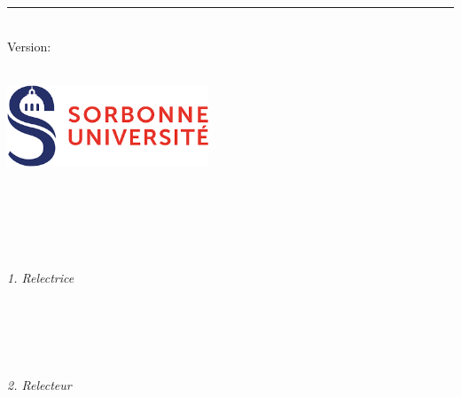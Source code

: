 
%
\begin{titlepage}
	\flushright
	\hfill
	\vfill
	{\LARGE\thesisTitle \par}
	\rule[5pt]{\textwidth}{.4pt} \par
	{\Large\thesisName}
	\vfill
	\textit{\large\thesisDate} \\
	Version: \thesisVersion
\end{titlepage}


\begin{titlepage}
	\tgherosfont
	\centering

	{\Large \thesisUniversity} \\[4mm]
	\includegraphics[width=6cm]{gfx/SU-logo.png} \\[2mm]
	\textsf{\thesisUniversityDepartment} \\
	\textsf{\thesisUniversityInstitute} \\

	\vfill
	{\large \thesisSubject} \\[5mm]
	{\LARGE \color{ctcolortitle}\textbf{\thesisTitle} \\[10mm]}
	{\Large \thesisName} \\

	\vfill
	\begin{minipage}[t]{.27\textwidth}
		\raggedleft
		\textit{1. Relectrice}
	\end{minipage}
	\hspace*{15pt}
	\begin{minipage}[t]{.65\textwidth}
		{\Large \thesisFirstReviewer} \\
	  	{\small \thesisFirstReviewerDepartment} \\[-1mm]
		{\small \thesisFirstReviewerUniversity}
	\end{minipage} \\[5mm]
	\begin{minipage}[t]{.27\textwidth}
		\raggedleft
		\textit{2. Relecteur}
	\end{minipage}
	\hspace*{15pt}
	\begin{minipage}[t]{.65\textwidth}
		{\Large \thesisSecondReviewer} \\
	  	{\small \thesisSecondReviewerDepartment} \\[-1mm]
		{\small \thesisSecondReviewerUniversity}
	\end{minipage} \\[10mm]
	

\end{titlepage}
